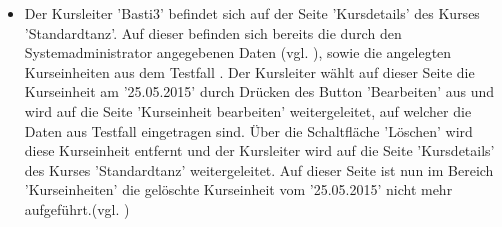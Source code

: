 \documentclass[a4paper]{scrreprt}
\begin{document}
\begin{itemize}
			\item {}
			Der Kursleiter 'Basti3' befindet sich auf der Seite 'Kursdetails' des Kurses 'Standardtanz'. Auf dieser befinden sich bereits die durch den Systemadministrator angegebenen Daten (vgl. ), sowie die angelegten Kurseinheiten aus dem Testfall . Der Kursleiter wählt auf dieser Seite die Kurseinheit am '25.05.2015' durch Drücken des Button 'Bearbeiten' aus und wird auf die Seite 'Kurseinheit bearbeiten' weitergeleitet, auf welcher die Daten aus Testfall  eingetragen sind. Über die Schaltfläche 'Löschen' wird diese Kurseinheit entfernt und der Kursleiter wird auf die Seite 'Kursdetails' des Kurses 'Standardtanz' weitergeleitet. Auf dieser Seite ist nun im Bereich 'Kurseinheiten' die gelöschte Kurseinheit vom '25.05.2015' nicht mehr aufgeführt.(vgl. )			
		\end{itemize}
			
\end{document}
